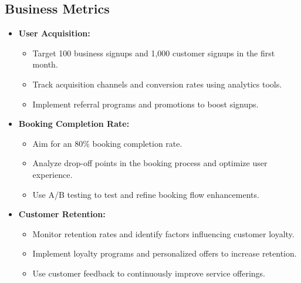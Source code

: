 \subsection{Business Metrics}
\begin{itemize}[leftmargin=*]
    \item \textbf{User Acquisition:}
    \begin{itemize}
        \item Target 100 business signups and 1,000 customer signups in the first month.
        \item Track acquisition channels and conversion rates using analytics tools.
        \item Implement referral programs and promotions to boost signups.
    \end{itemize}
    
    \item \textbf{Booking Completion Rate:}
    \begin{itemize}
        \item Aim for an 80\% booking completion rate.
        \item Analyze drop-off points in the booking process and optimize user experience.
        \item Use A/B testing to test and refine booking flow enhancements.
    \end{itemize}
    
    \item \textbf{Customer Retention:}
    \begin{itemize}
        \item Monitor retention rates and identify factors influencing customer loyalty.
        \item Implement loyalty programs and personalized offers to increase retention.
        \item Use customer feedback to continuously improve service offerings.
    \end{itemize}
\end{itemize}

